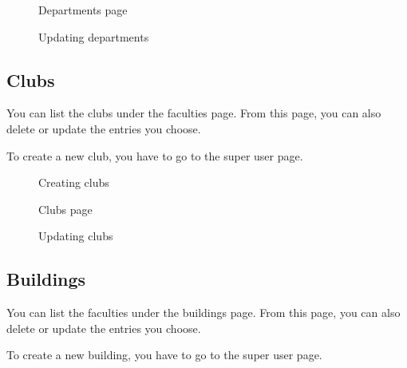 \documentclass[letterpaper,10pt,english]{sphinxmanual}
\begin{document}
\begin{figure}[htbp]
\centering
\capstart

\noindent{}
\caption{Departments page}\label{\detokenize{user/kaplan:id12}}\end{figure}

\begin{figure}[htbp]
\centering
\capstart

\noindent{}
\caption{Updating departments}\label{\detokenize{user/kaplan:id13}}\end{figure}


\subsection{Clubs}
\label{\detokenize{user/kaplan:clubs}}
You can list the clubs under the faculties page. From this page, you can also delete or update
the entries you choose.

To create a new club, you have to go to the super user page.

\begin{figure}[htbp]
\centering
\capstart

\noindent{}
\caption{Creating clubs}\label{\detokenize{user/kaplan:id14}}\end{figure}

\begin{figure}[htbp]
\centering
\capstart

\noindent{}
\caption{Clubs page}\label{\detokenize{user/kaplan:id15}}\end{figure}

\begin{figure}[htbp]
\centering
\capstart

\noindent{}
\caption{Updating clubs}\label{\detokenize{user/kaplan:id16}}\end{figure}


\subsection{Buildings}
\label{\detokenize{user/kaplan:buildings}}
You can list the faculties under the buildings page. From this page, you can also delete or update
the entries you choose.

To create a new building, you have to go to the super user page.
\end{document}
